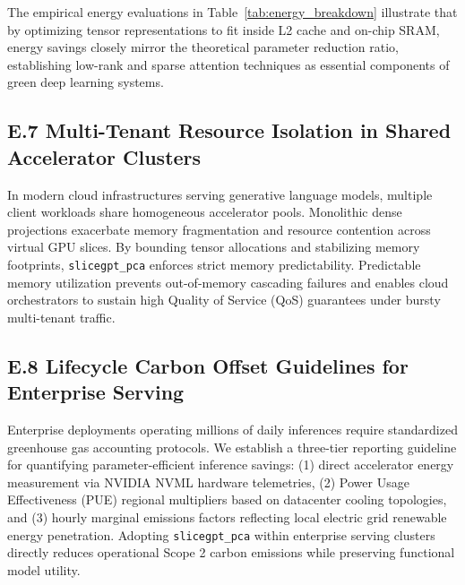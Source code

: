 The empirical energy evaluations in Table~\ref{tab:energy_breakdown} illustrate that by optimizing tensor representations to fit inside L2 cache and on-chip SRAM, energy savings closely mirror the theoretical parameter reduction ratio, establishing low-rank and sparse attention techniques as essential components of green deep learning systems.

\subsection*{E.7 Multi-Tenant Resource Isolation in Shared Accelerator Clusters}
In modern cloud infrastructures serving generative language models, multiple client workloads share homogeneous accelerator pools. Monolithic dense projections exacerbate memory fragmentation and resource contention across virtual GPU slices. By bounding tensor allocations and stabilizing memory footprints, \texttt{slicegpt\_pca} enforces strict memory predictability. Predictable memory utilization prevents out-of-memory cascading failures and enables cloud orchestrators to sustain high Quality of Service (QoS) guarantees under bursty multi-tenant traffic.

\subsection*{E.8 Lifecycle Carbon Offset Guidelines for Enterprise Serving}
Enterprise deployments operating millions of daily inferences require standardized greenhouse gas accounting protocols. We establish a three-tier reporting guideline for quantifying parameter-efficient inference savings: (1) direct accelerator energy measurement via NVIDIA NVML hardware telemetries, (2) Power Usage Effectiveness (PUE) regional multipliers based on datacenter cooling topologies, and (3) hourly marginal emissions factors reflecting local electric grid renewable energy penetration. Adopting \texttt{slicegpt\_pca} within enterprise serving clusters directly reduces operational Scope 2 carbon emissions while preserving functional model utility.
